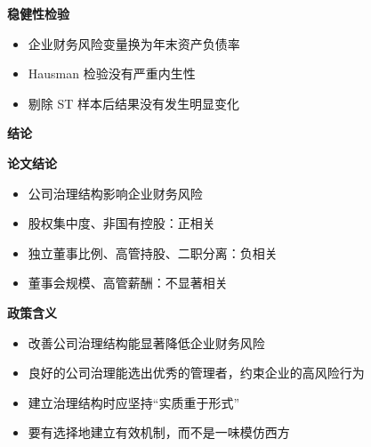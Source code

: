 \documentclass[aspectratio=169,UTF8,zihao=-4]{ctexbeamer}
\newcommand{\bigidea}[1]{
  \begin{center}
    \vspace{0.8em}
    {\LARGE \bfseries #1}
    \vspace{0.6em}
  \end{center}
}
\newcommand{\sectionpageframe}[1]{
  \begin{frame}[plain]
    \begin{center}
      \vfill
      {\Huge \bfseries #1}
      \vfill
    \end{center}
  \end{frame}
}
\begin{document}
\begin{frame}
  \bigidea{稳健性检验}
  \begin{itemize}
    \item \Large 企业财务风险变量换为年末资产负债率
    \item \Large Hausman 检验没有严重内生性
    \item \Large 剔除 ST 样本后结果没有发生明显变化
  \end{itemize}
\end{frame}

\sectionpageframe{结论}

\begin{frame}
  \bigidea{论文结论}
  \begin{itemize}
    \item \Large 公司治理结构影响企业财务风险
    \item \Large 股权集中度、非国有控股：正相关  
    \item \Large 独立董事比例、高管持股、二职分离：负相关
    \item \Large 董事会规模、高管薪酬：不显著相关
  \end{itemize}
\end{frame}

\begin{frame}
  \bigidea{政策含义}
  \begin{itemize}
    \item \Large 改善公司治理结构能显著降低企业财务风险
    \item \Large 良好的公司治理能选出优秀的管理者，约束企业的高风险行为
    \item \Large 建立治理结构时应坚持“实质重于形式”
    \item \Large 要有选择地建立有效机制，而不是一味模仿西方
  \end{itemize}
\end{frame}
\end{document}
